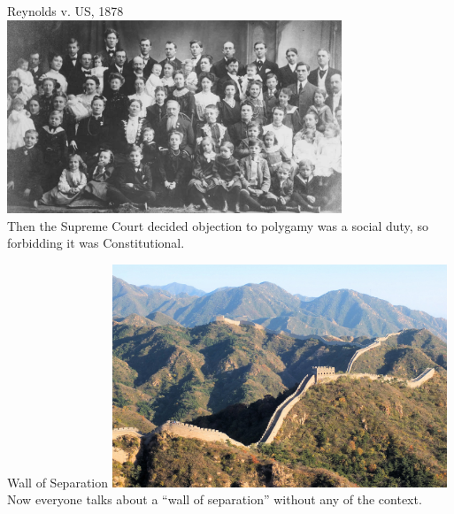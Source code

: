 \begin{frame}{Reynolds v. US, 1878}
    \centering
    \includegraphics[width=0.75\textwidth]{img/Joseph-F-Smith-family.png} \\
    Then the Supreme Court decided objection to polygamy was a social duty, so forbidding it was Constitutional.
\end{frame}

\begin{frame}{Wall of Separation}
    \centering
    \includegraphics[width=0.75\textwidth]{img/great-wall.jpg} \\
    Now everyone talks about a ``wall of separation'' without any of the context.
\end{frame}

